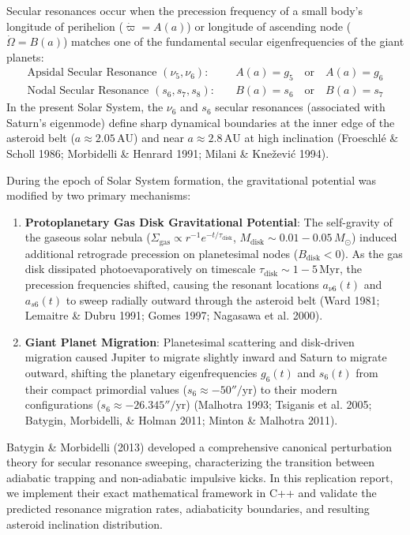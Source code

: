 \documentclass[11pt,a4paper]{article}
\begin{document}
Secular resonances occur when the precession frequency of a small body's longitude of perihelion ($\dot{\varpi} = A(a)$) or longitude of ascending node ($\dot{\Omega} = B(a)$) matches one of the fundamental secular eigenfrequencies of the giant planets:
\begin{align}
\text{Apsidal Secular Resonance } (\nu_5, \nu_6): \quad & A(a) = g_5 \quad \text{or} \quad A(a) = g_6 \\
\text{Nodal Secular Resonance } (s_6, s_7, s_8): \quad & B(a) = s_6 \quad \text{or} \quad B(a) = s_7
\end{align}
In the present Solar System, the $\nu_6$ and $s_6$ secular resonances (associated with Saturn's eigenmode) define sharp dynamical boundaries at the inner edge of the asteroid belt ($a \approx 2.05\,\text{AU}$) and near $a \approx 2.8\,\text{AU}$ at high inclination (Froeschl{\'e} \& Scholl 1986; Morbidelli \& Henrard 1991; Milani \& Kne{\v z}evi{\'c} 1994).

During the epoch of Solar System formation, the gravitational potential was modified by two primary mechanisms:
\begin{enumerate}
    \item \textbf{Protoplanetary Gas Disk Gravitational Potential}: The self-gravity of the gaseous solar nebula ($\Sigma_{\text{gas}} \propto r^{-1} e^{-t/\tau_{\text{disk}}}$, $M_{\text{disk}} \sim 0.01 - 0.05\,M_\odot$) induced additional retrograde precession on planetesimal nodes ($B_{\text{disk}} < 0$). As the gas disk dissipated photoevaporatively on timescale $\tau_{\text{disk}} \sim 1 - 5\,\text{Myr}$, the precession frequencies shifted, causing the resonant locations $a_{\nu 6}(t)$ and $a_{s 6}(t)$ to sweep radially outward through the asteroid belt (Ward 1981; Lemaitre \& Dubru 1991; Gomes 1997; Nagasawa et al. 2000).
    \item \textbf{Giant Planet Migration}: Planetesimal scattering and disk-driven migration caused Jupiter to migrate slightly inward and Saturn to migrate outward, shifting the planetary eigenfrequencies $g_6(t)$ and $s_6(t)$ from their compact primordial values ($s_6 \approx -50''/\text{yr}$) to their modern configurations ($s_6 \approx -26.345''/\text{yr}$) (Malhotra 1993; Tsiganis et al. 2005; Batygin, Morbidelli, \& Holman 2011; Minton \& Malhotra 2011).
\end{enumerate}

Batygin \& Morbidelli (2013) developed a comprehensive canonical perturbation theory for secular resonance sweeping, characterizing the transition between adiabatic trapping and non-adiabatic impulsive kicks. In this replication report, we implement their exact mathematical framework in C++ and validate the predicted resonance migration rates, adiabaticity boundaries, and resulting asteroid inclination distribution.
\end{document}

